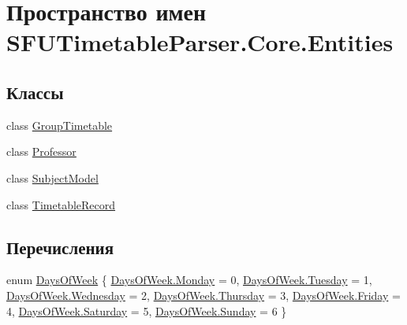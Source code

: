 \hypertarget{namespace_s_f_u_timetable_parser_1_1_core_1_1_entities}{}\section{Пространство имен S\+F\+U\+Timetable\+Parser.\+Core.\+Entities}
\label{namespace_s_f_u_timetable_parser_1_1_core_1_1_entities}
\subsection*{Классы}
\begin{DoxyCompactItemize}
\item 
class \hyperlink{class_s_f_u_timetable_parser_1_1_core_1_1_entities_1_1_group_timetable}{Group\+Timetable}
\item 
class \hyperlink{class_s_f_u_timetable_parser_1_1_core_1_1_entities_1_1_professor}{Professor}
\item 
class \hyperlink{class_s_f_u_timetable_parser_1_1_core_1_1_entities_1_1_subject_model}{Subject\+Model}
\item 
class \hyperlink{class_s_f_u_timetable_parser_1_1_core_1_1_entities_1_1_timetable_record}{Timetable\+Record}
\end{DoxyCompactItemize}
\subsection*{Перечисления}
\begin{DoxyCompactItemize}
\item 
enum \hyperlink{namespace_s_f_u_timetable_parser_1_1_core_1_1_entities_a24625cfb0f8355baf5eebfe2032c4169}{Days\+Of\+Week} \{ \newline
\hyperlink{namespace_s_f_u_timetable_parser_1_1_core_1_1_entities_a24625cfb0f8355baf5eebfe2032c4169a6f8522e0610541f1ef215a22ffa66ff6}{Days\+Of\+Week.\+Monday} = 0, 
\hyperlink{namespace_s_f_u_timetable_parser_1_1_core_1_1_entities_a24625cfb0f8355baf5eebfe2032c4169a5792315f09a5d54fb7e3d066672b507f}{Days\+Of\+Week.\+Tuesday} = 1, 
\hyperlink{namespace_s_f_u_timetable_parser_1_1_core_1_1_entities_a24625cfb0f8355baf5eebfe2032c4169a796c163589f295373e171842f37265d5}{Days\+Of\+Week.\+Wednesday} = 2, 
\hyperlink{namespace_s_f_u_timetable_parser_1_1_core_1_1_entities_a24625cfb0f8355baf5eebfe2032c4169a78ae6f0cd191d25147e252dc54768238}{Days\+Of\+Week.\+Thursday} = 3, 
\newline
\hyperlink{namespace_s_f_u_timetable_parser_1_1_core_1_1_entities_a24625cfb0f8355baf5eebfe2032c4169ac33b138a163847cdb6caeeb7c9a126b4}{Days\+Of\+Week.\+Friday} = 4, 
\hyperlink{namespace_s_f_u_timetable_parser_1_1_core_1_1_entities_a24625cfb0f8355baf5eebfe2032c4169a8b7051187b9191cdcdae6ed5a10e5adc}{Days\+Of\+Week.\+Saturday} = 5, 
\hyperlink{namespace_s_f_u_timetable_parser_1_1_core_1_1_entities_a24625cfb0f8355baf5eebfe2032c4169a9d1a0949c39e66a0cd65240bc0ac9177}{Days\+Of\+Week.\+Sunday} = 6
 \}
\end{DoxyCompactItemize}



